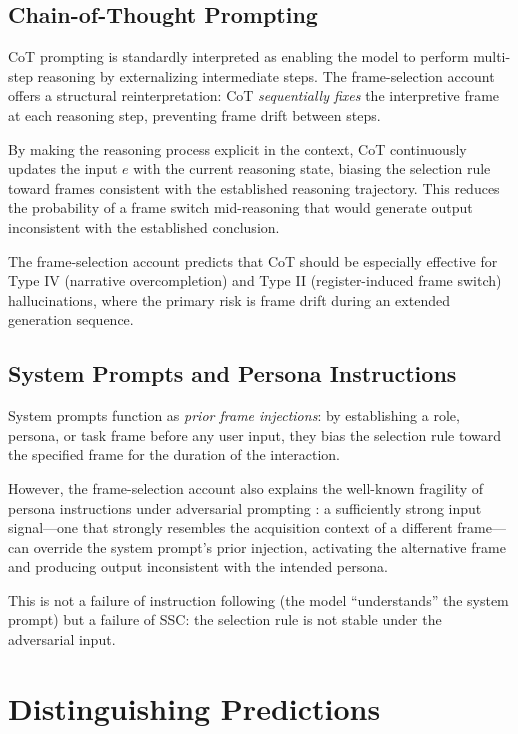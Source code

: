 \documentclass[12pt]{article}
\begin{document}
\subsection{Chain-of-Thought Prompting}

CoT prompting is standardly interpreted as enabling the model to
perform multi-step reasoning by externalizing intermediate steps.
The frame-selection account offers a structural reinterpretation:
CoT \emph{sequentially fixes} the interpretive frame at each
reasoning step, preventing frame drift between steps.

By making the reasoning process explicit in the context, CoT
continuously updates the input $e$ with the current reasoning
state, biasing the selection rule toward frames consistent with
the established reasoning trajectory. This reduces the probability
of a frame switch mid-reasoning that would generate output
inconsistent with the established conclusion.

The frame-selection account predicts that CoT should be especially
effective for Type IV (narrative overcompletion) and Type II
(register-induced frame switch) hallucinations, where the primary
risk is frame drift during an extended generation sequence.

\subsection{System Prompts and Persona Instructions}

System prompts function as \emph{prior frame injections}: by
establishing a role, persona, or task frame before any user input,
they bias the selection rule toward the specified frame for the
duration of the interaction.

However, the frame-selection account also explains the well-known
fragility of persona instructions under adversarial prompting
\cite{perez2022ignore, wei2023jailbroken}: a sufficiently strong
input signal---one that strongly resembles the acquisition context
of a different frame---can override the system prompt's prior
injection, activating the alternative frame and producing output
inconsistent with the intended persona.

This is not a failure of instruction following (the model
``understands'' the system prompt) but a failure of SSC: the
selection rule is not stable under the adversarial input.

\section{Distinguishing Predictions}
\label{sec:predictions}
\end{document}

